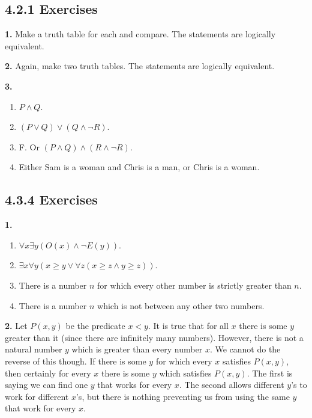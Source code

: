 \documentclass[10pt,]{book}
\theoremstyle{plain}
\theoremstyle{definition}
\theoremstyle{definition}
\theoremstyle{definition}
\numberwithin{equation}{chapter}
\newcommand{\lt}{ < }
\begin{document}
\subsection*{4.2.1 Exercises}
\noindent\textbf{1.}\quad{}
          Make a truth table for each and compare. The statements are logically equivalent.
\par\smallskip
\noindent\textbf{2.}\quad{}
          Again, make two truth tables. The statements are logically equivalent.
\par\smallskip
\noindent\textbf{3.}\quad{}\leavevmode%
\begin{enumerate}[label=(\alph*)]
\item\hypertarget{li-1065}{}\(P \wedge Q\).%
\item\hypertarget{li-1066}{}\((P \vee Q) \vee (Q \wedge \neg R)\).%
\item\hypertarget{li-1067}{} F. Or \((P \wedge Q) \wedge (R \wedge \neg R)\). %
\item\hypertarget{li-1068}{} Either Sam is a woman and Chris is a man, or Chris is a woman. %
\end{enumerate}
\par\smallskip
\subsection*{4.3.4 Exercises}
\noindent\textbf{1.}\quad{}\leavevmode%
\begin{enumerate}[label=(\alph*)]
\item\hypertarget{li-1075}{}\(\forall x \exists y (O(x) \wedge \neg E(y))\).%
\item\hypertarget{li-1076}{}\(\exists x \forall y (x \ge y \vee \forall z (x \ge z \wedge y \ge z))\).%
\item\hypertarget{li-1077}{}
                There is a number \(n\) for which every other number is strictly greater than \(n\).
\item\hypertarget{li-1078}{}
                There is a number \(n\) which is not between any other two numbers.
\end{enumerate}
\par\smallskip
\noindent\textbf{2.}\quad{}
            Let \(P(x,y)\) be the predicate \(x \lt  y\). It is true that for all \(x\) there is some \(y\) greater than it (since there are infinitely many numbers). However, there is not a natural number \(y\) which is greater than every number \(x\). We cannot do the reverse of this though. If there is some \(y\) for which every \(x\) satisfies \(P(x,y)\), then certainly for every \(x\) there is some \(y\) which satisfies \(P(x,y)\). The first is saying we can find one \(y\) that works for every \(x\). The second allows different \(y\)'s to work for different \(x\)'s, but there is nothing preventing us from using the same \(y\) that work for every \(x\).
\par\smallskip
\end{document}
